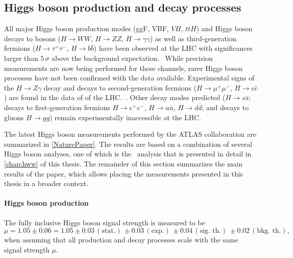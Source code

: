 \subsection{Higgs boson production and decay processes}
All major Higgs boson production modes (ggF, VBF, $VH$, $ttH$) and Higgs boson decays to bosons ($H \to WW$, $H \to ZZ$, $H \to \gamma\gamma$) as well as third-generation fermions ($H \to \tau^+\tau^-$, $H \to b\bar{b}$) have been observed at the LHC with significances larger than $5\,\sigma$ above the background expectation.~\cite{NaturePaper}
While precision measurements are now being performed for these channels, rarer Higgs boson processes have not been confirmed with the data available. 
Experimental signs of the $H \to Z\gamma$ decay and decays to second-generation fermions ($H \to \mu^+\mu^-$, $H \to c\bar{c}$) are found in the data of \RunTwo of the LHC.~\cite{HIGG-2018-42,HIGG-2019-14,ATLAS-CONF-2021-021}.
Other decay modes predicted ($H \to s\bar{s}$; decays to first-generation fermions $H \to e^+e^-$, $H \to u\bar{u}$, $H \to d\bar{d}$; and decays to gluons $H \to gg$) remain experimentally inaccessible at the LHC. 

The latest Higgs boson measurements performed by the ATLAS collaboration are summarized in \cref{NaturePaper}.
The results are based on a combination of several Higgs boson analyses, one of which is the \HWW\ analysis that is presented in detail in \cref{chap:hww} of this thesis. 
The remainder of this section summarizes the main results of the paper, which allows placing the measurements presented in this thesis in a broader context. 


\paragraph{Higgs boson production}
The fully inclusive Higgs boson signal strength is measured to be \cite{NaturePaper}
\begin{equation*}
   \mu =1.05 \pm 0.06 = 1.05\pm 0.03\, (\text{stat.})\, \pm 0.03\, (\text{exp.})\, \pm 0.04\, (\text{sig.\ th.})\, \pm 0.02\, (\text{bkg.\ th.}),
\end{equation*}
when assuming that all production and decay processes scale with the same signal strength $\mu$.

